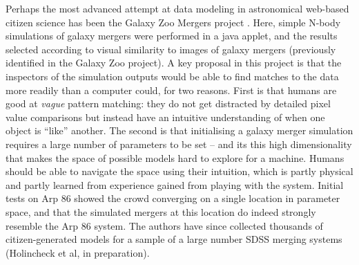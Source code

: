 \documentclass{ar2e}
\begin{document}
Perhaps the most advanced attempt at data modeling in astronomical web-based
citizen science has been the Galaxy Zoo Mergers project
\citep{HolincheckEtal2010,WallinEtal2010}. Here, simple N-body simulations of
galaxy mergers were performed in a java applet, and the results selected
according to visual similarity to images of galaxy mergers (previously
identified in the Galaxy Zoo project). A key proposal in this project is that
the inspectors of the simulation outputs would be able to find matches to the
data more readily than a computer could, for two reasons. First is that humans
are good at {\it vague} pattern matching: they do not get distracted by
detailed pixel value comparisons but instead have an intuitive understanding
of when one object is ``like'' another. The second is that initialising a
galaxy merger simulation requires a large number of parameters to be set --
and its this high dimensionality  that makes the space of possible models hard
to explore for a machine. Humans should be able to navigate the space using
their intuition, which is partly physical and partly learned from experience
gained from playing with the system. Initial tests on Arp 86  showed the crowd
converging on a single location in parameter space, and that the simulated
mergers at this location do indeed strongly resemble the Arp 86 system. The
authors have since collected thousands of citizen-generated models for a
sample of a large number SDSS merging systems (Holincheck et al, in
preparation). 
\end{document}
